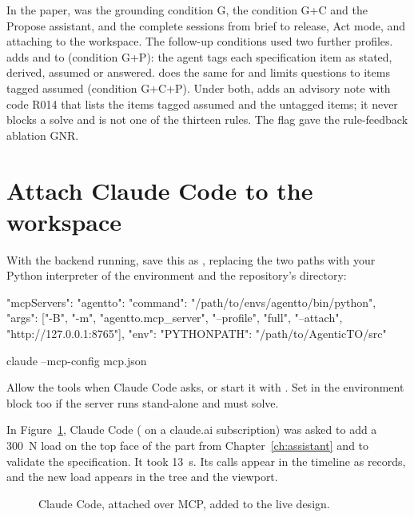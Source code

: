 

In the paper,  was the grounding condition G,  the condition G+C and the Propose assistant, and
 the complete sessions from brief to release, Act mode, and attaching to the workspace. The follow-up
conditions used two further profiles.  adds  and  to 
(condition G+P): the agent tags each specification item as stated, derived, assumed or answered.
 does the same for  and limits questions to items tagged assumed (condition G+C+P).
Under both,  adds an advisory note with code R014 that lists the items tagged assumed and the
untagged items; it never blocks a solve and is not one of the thirteen rules. The  flag gave the
rule-feedback ablation GNR.

\section{Attach Claude Code to the workspace}
With the backend running, save this as , replacing the two paths with your Python interpreter of the
 environment and the repository's  directory:

\begin{jsoncode}
{"mcpServers": {"agentto": {
  "command": "/path/to/envs/agentto/bin/python",
  "args": ["-B", "-m", "agentto.mcp_server", "--profile", "full",
           "--attach", "http://127.0.0.1:8765"],
  "env": {"PYTHONPATH": "/path/to/AgenticTO/src"}}}}
\end{jsoncode}

\begin{shell}
claude --mcp-config mcp.json
\end{shell}

Allow the  tools when Claude Code asks, or start it with .
Set  in the environment block too if the server runs stand-alone and must solve.

In Figure~\ref{fig:attach}, Claude Code ( on a claude.ai subscription) was asked to add a 300~N
load on the top face of the part from Chapter~\ref{ch:assistant} and to validate the specification. It took 13~s. Its
calls appear in the timeline as  records, and the new load appears in the tree and the viewport.

\begin{figure}[t]
\caption{Claude Code, attached over MCP, added  to the live design.}
\label{fig:attach}
\end{figure}

